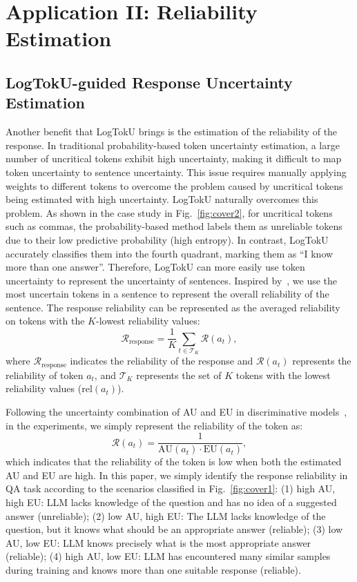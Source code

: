 \section{Application II: Reliability Estimation}
\subsection{LogTokU-guided Response Uncertainty Estimation}

Another benefit that LogTokU brings is the estimation of the reliability of the response. In traditional probability-based token uncertainty estimation, a large number of uncritical tokens exhibit high uncertainty, making it difficult to map token uncertainty to sentence uncertainty. This issue requires manually applying weights to different tokens to overcome the problem caused by uncritical tokens being estimated with high uncertainty. LogTokU naturally overcomes this problem. As shown in the case study in Fig.~\ref{fig:cover2}, for uncritical tokens such as commas, the probability-based method labels them as unreliable tokens due to their low predictive probability (high entropy). In contrast, LogTokU accurately classifies them into the fourth quadrant, marking them as ``I know more than one answer''. Therefore, LogTokU can more easily use token uncertainty to represent the uncertainty of sentences. Inspired by~\cite{duan2024shifting}, we use the most uncertain tokens in a sentence to represent the overall reliability of the sentence. The response reliability can be represented as the averaged reliability on tokens with the $K$-lowest reliability values:
\begin{equation}
    \mathcal{R}_{\text{response}} = \frac{1}{K} \sum_{t \in \mathcal{T}_{K}} \mathcal{R}(a_{t}),
\end{equation}
where $ \mathcal{R}_{\text{response}}$ indicates the reliability of the response and $\mathcal{R}(a_{t})$ represents the reliability of token $a_t$, and \(\mathcal{T}_{K}\) represents the set of \(K\) tokens with the lowest reliability values (\(\text{rel}(a_{t})\)).



Following the uncertainty combination of AU and EU in discriminative models~\cite{abdar2021review}, in the experiments, we simply represent the reliability of the token as: 
\begin{equation}
    \mathcal{R}(a_{t}) =\frac{1}{\text{AU}(a_t)\cdot \text{EU}(a_t)},
\end{equation}
which indicates that the reliability of the token is low when both the estimated AU and EU are high. In this paper, we simply identify the response reliability in QA task according to the scenarios classified in Fig.~\ref{fig:cover1}: (1) high AU, high EU: LLM lacks knowledge of the question and has no idea of a suggested answer (unreliable); (2) low AU, high EU: The LLM lacks knowledge of the question, but it knows what should be an appropriate answer (reliable); (3) low AU, low EU: LLM knows precisely what is the most appropriate answer (reliable);
(4) high AU, low EU: LLM has encountered many similar samples during training and knows more than one suitable response (reliable). 



